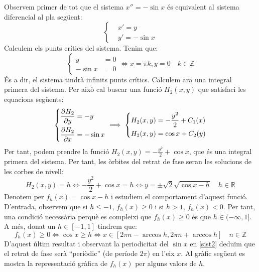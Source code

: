 \documentclass[10pt,a4paper]{article}
\newcommand{\RR}{\ensuremath{\mathbb{R}}}
\newcommand{\ZZ}{\ensuremath{\mathbb{Z}}}
\begin{document}
Observem primer de tot que el sistema $x''=-\sin x$ és equivalent al sistema diferencial al pla següent:
\begin{equation}\label{sist2}
  \left\{
  \begin{aligned}
     & x' =y        \\
     & y'  =-\sin x
  \end{aligned}
  \right.
\end{equation}
Calculem els punts crítics del sistema. Tenim que:
\begin{equation*}
  \left\{
  \begin{aligned}
    y       & =        0 \\
    -\sin x & =  0
  \end{aligned}
  \right.
  \iff x=\pi k, y=0\quad k\in\ZZ
\end{equation*}
És a dir, el sistema tindrà infinits punts crítics. Calculem ara una integral primera del sistema.
Per això cal buscar una funció $H_2(x,y)$ que satisfaci les equacions següents:
$$
  \left\{
  \begin{aligned}
    \pdv{H_2}{y}(x,y) & = -y     \\
    \pdv{H_2}{x}(x,y) & =-\sin x
  \end{aligned}\right.
  \implies
  \left\{
  \begin{aligned}
    H_2(x,y) & = -\frac{y^2}{2}+C_1(x) \\
    H_2(x,y) & =\cos x+C_2(y)
  \end{aligned}\right.
$$
Per tant, podem prendre la funció $H_2(x,y)=-\frac{y^2}{2}+\cos x$, que és una integral primera del sistema. Per tant, les òrbites del retrat de fase seran les solucions de les corbes de nivell: $$H_2(x,y)=h\iff -\frac{y^2}{2}+\cos x=h\iff y=\pm\sqrt{2}\sqrt{\cos x-h}\quad h\in\RR$$
Denotem per $f_h(x)=\cos x-h$ i estudiem el comportament d'aquest funció. D'entrada, observem que si $h\leq -1$, $f_h(x)\geq 0$ i si $h> 1$, $f_h(x)<0$. Per tant, una condició necessària perquè es compleixi que $f_h(x)\geq 0$ és que $h\in(-\infty,1]$. A més, donat un $h\in [-1,1]$ tindrem que: $$f_h(x)\geq 0\iff \cos x\geq h\iff x\in[2\pi n-\arccos h,2\pi n+\arccos h]\quad n\in\ZZ$$
D'aquest últim resultat i observant la periodicitat del $\sin x$ en \eqref{sist2} deduïm que el retrat de fase serà ``periòdic'' (de període $2\pi$) en l'eix $x$. Al gràfic següent es mostra la representació gràfica de $f_h(x)$ per alguns valors de $h$.
\begin{center}
  \begin{minipage}{\linewidth}
    \centering
    
  \end{minipage}
\end{center}
\end{document}
